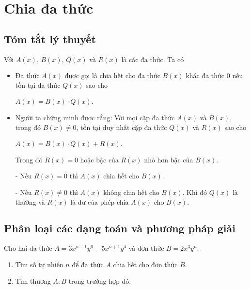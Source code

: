 \section{Chia đa thức}
\subsection{Tóm tắt lý thuyết}
Với $A(x)$, $B(x)$, $Q(x)$ và $R(x)$ là các đa thức. Ta có
\begin{itemize}
	\item Đa thức $A(x)$ được gọi là chia hết cho đa thức $B(x)$ khác đa thức $0$ nếu tồn tại đa thức $Q(x)$ sao cho
		\begin{center}
			$A(x)=B(x)\cdot Q(x)$.
		\end{center}
	\item Người ta chứng minh được rằng: Với mọi cặp đa thức $A(x)$ và $B(x)$, trong đó $B(x)\ne 0$, tồn tại duy nhất cặp đa thức $Q(x)$ và $R(x)$ sao cho
	\begin{center}
		$A(x)=B(x)\cdot Q(x)+R(x)$.
	\end{center}
Trong đó $R(x)=0$ hoặc bậc của $R(x)$ nhỏ hơn bậc của $B(x)$.
\item[-] Nếu $R(x)=0$ thì $A(x)$ chia hết cho $B(x)$.
\item[-] Nếu $R(x)\ne 0$ thì $A(x)$ không chia hết cho $B(x)$. Khi đó $Q(x)$ là thường và $R(x)$ là dư của phép chia $A(x)$ cho $B(x)$.
\end{itemize}
\subsection{Phân loại các dạng toán và phương pháp giải}
\begin{vd}%
	Cho hai đa thức $A=3x^{n-1}y^6-5x^{n+1}y^4$ và đơn thức $B=2x^3y^n$.
	\begin{enumerate}
		\item Tìm số tự nhiên $n$ để đa thức $A$ chia hết cho đơn thức $B$.
		\item Tìm thương $A : B$ trong trường hợp đó.
	\end{enumerate}
\end{vd}

